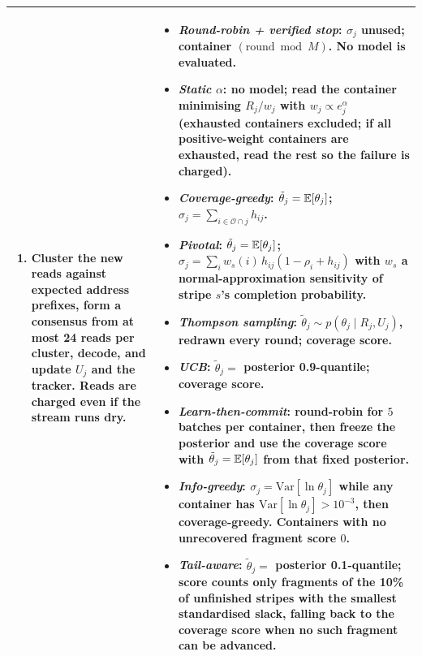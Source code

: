 \begin{table}[!t]
\begin{tabular}{@{}p{}p{}@{}}
\begin{enumerate}[leftmargin=4mm,itemsep=0pt,topsep=1pt]
\begin{enumerate}[leftmargin=3mm,itemsep=0pt,topsep=0pt]
  \item Cluster the new reads against expected address prefixes, form a consensus from at most 24 reads
  per cluster, decode, and update $U_j$ and the tracker.  Reads are charged even if the stream runs dry.
  \end{enumerate}
\end{enumerate}
\vspace{-5mm}
&
\vspace{-3mm}
\begin{itemize}[leftmargin=4mm,itemsep=1pt,topsep=1pt]
\item \emph{Round-robin + verified stop}: $\sigma_j$ unused; container $(\text{round}\bmod M)$.  No
model is evaluated.
\item \emph{Static} $\alpha$: no model; read the container minimising $R_j/w_j$ with
$w_j\propto e_j^{\alpha}$ (exhausted containers excluded; if all positive-weight containers are
exhausted, read the rest so the failure is charged).
\item \emph{Coverage-greedy}: $\tilde\theta_j=\mathbb{E}[\theta_j]$;
$\sigma_j=\sum_{i\in\mathcal O\cap j}h_{ij}$.
\item \emph{Pivotal}: $\tilde\theta_j=\mathbb{E}[\theta_j]$; $\sigma_j=\sum_i w_s(i)\,h_{ij}(1-\rho_i+h_{ij})$
with $w_s$ a normal-approximation sensitivity of stripe $s$'s completion probability.
\item \emph{Thompson sampling}: $\tilde\theta_j\sim p(\theta_j\mid R_j,U_j)$, redrawn every round;
coverage score.
\item \emph{UCB}: $\tilde\theta_j=$ posterior 0.9-quantile; coverage score.
\item \emph{Learn-then-commit}: round-robin for $5$ batches per container, then freeze the posterior
and use the coverage score with $\tilde\theta_j=\mathbb{E}[\theta_j]$ from that fixed posterior.
\item \emph{Info-greedy}: $\sigma_j=\mathrm{Var}[\ln\theta_j]$ while any container has
$\mathrm{Var}[\ln\theta_j]>10^{-3}$, then coverage-greedy.  Containers with no unrecovered fragment score $0$.
\item \emph{Tail-aware}: $\tilde\theta_j=$ posterior 0.1-quantile; score counts only fragments of the
10\% of unfinished stripes with the smallest standardised slack, falling back to the coverage score
when no such fragment can be advanced.
\end{itemize}
\vspace{-5mm}
\\
\bottomrule
\end{tabular}


\end{table}
